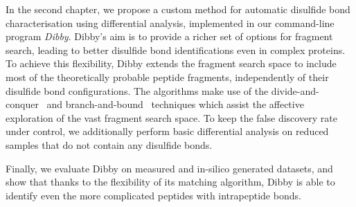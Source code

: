 In the second chapter, we propose a custom method for automatic disulfide bond characterisation using differential analysis, implemented in our command-line program \emph{Dibby}. Dibby's aim is to provide a richer set of options for fragment search, leading to better disulfide bond identifications even in complex proteins. To achieve this flexibility, Dibby extends the fragment search space to include most of the theoretically probable peptide fragments, independently of their disulfide bond configurations. The algorithms make use of the divide-and-conquer~\cite{smith1985design} and branch-and-bound~\cite{boyd2007branch} techniques which assist the affective exploration of the vast fragment search space. To keep the false discovery rate under control, we additionally perform basic differential analysis on reduced samples that do not contain any disulfide bonds.

Finally, we evaluate Dibby on measured and in-silico generated datasets, and show that thanks to the flexibility of its matching algorithm, Dibby is able to identify even the more complicated peptides with intrapeptide bonds.
